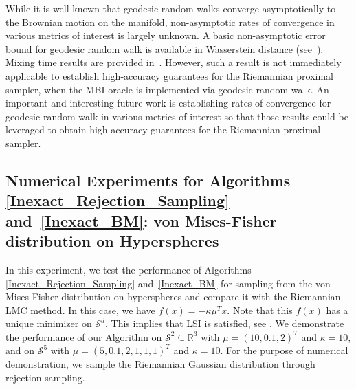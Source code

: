 While it is well-known that geodesic random walks converge asymptotically to the Brownian motion on the manifold, non-asymptotic rates of convergence in various metrics of interest is largely unknown. A basic non-asymptotic error bound for geodesic random walk is available in Wasserstein distance (see~\citet[Lemma 7]{cheng2022efficient}). Mixing time results are provided in~\cite{mangoubi2018rapid}. However, such a result is not immediately applicable to establish high-accuracy guarantees for the Riemannian proximal sampler, when the MBI oracle is implemented via geodesic random walk. An important and interesting future work is establishing rates of convergence for geodesic random walk in various metrics of interest so that those results could be leveraged to obtain high-accuracy guarantees for the Riemannian proximal sampler. 

 






\subsection{Numerical Experiments for Algorithms \ref{Inexact_Rejection_Sampling} and~\ref{Inexact_BM}: von Mises-Fisher distribution on Hyperspheres}\label{hkimplem}
In this experiment, we test the performance of Algorithms \ref{Inexact_Rejection_Sampling} and~\ref{Inexact_BM} for sampling from the von Mises-Fisher distribution on hyperspheres and compare it with the Riemannian LMC method. 
In this case, we have $f(x) = - \kappa \mu^{T} x$.
Note that this $f(x)$ has a unique minimizer on $\mathcal{S}^{d}$.
This implies that LSI is satisfied, see \cite[Theorem 3.4]{li2023riemannian}. We demonstrate the performance of our Algorithm on $\mathcal{S}^{2} \subseteq \mathbb{R}^{3}$ with $\mu = (10, 0.1, 2)^{T}$ and $\kappa = 10$, and on $\mathcal{S}^{5}$ with $\mu = (5, 0.1, 2, 1, 1, 1)^{T}$ and $\kappa = 10$. For the purpose of numerical demonstration, we sample the Riemannian Gaussian distribution through rejection sampling. 

